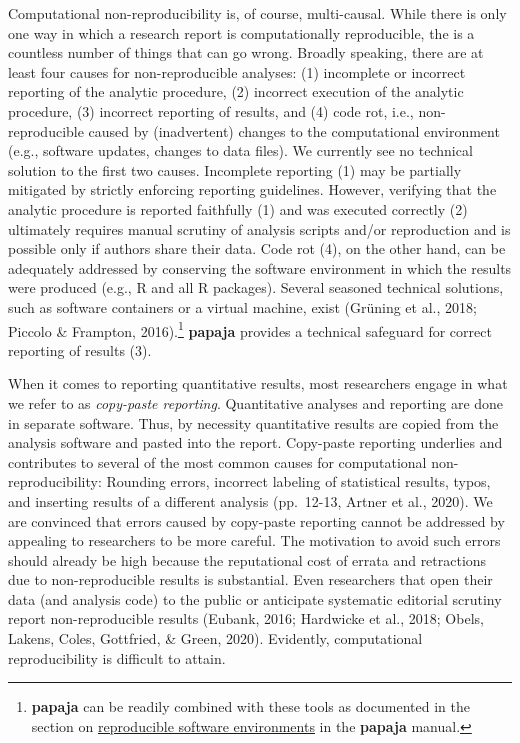 \documentclass[
  english,
  ,man,floatsintext]{apa6}
\begin{document}
Computational non-reproducibility is, of course, multi-causal.
While there is only one way in which a research report is computationally reproducible, the is a countless number of things that can go wrong.
Broadly speaking, there are at least four causes for non-reproducible analyses: (1) incomplete or incorrect reporting of the analytic procedure, (2) incorrect execution of the analytic procedure, (3) incorrect reporting of results, and (4) code rot, i.e., non-reproducible caused by (inadvertent) changes to the computational environment (e.g., software updates, changes to data files).
We currently see no technical solution to the first two causes.
Incomplete reporting (1) may be partially mitigated by strictly enforcing reporting guidelines.
However, verifying that the analytic procedure is reported faithfully (1) and was executed correctly (2) ultimately requires manual scrutiny of analysis scripts and/or reproduction and is possible only if authors share their data.
Code rot (4), on the other hand, can be adequately addressed by conserving the software environment in which the results were produced (e.g., R and all R packages).
Several seasoned technical solutions, such as software containers or a virtual machine, exist (Grüning et al., 2018; Piccolo \& Frampton, 2016).\footnote{\textbf{papaja} can be readily combined with these tools as documented in the section on \href{https://frederikaust.com/papaja_man/tips-and-tricks.html\#reproducible-software-environments}{reproducible software environments} in the \textbf{papaja} manual.}
\textbf{papaja} provides a technical safeguard for correct reporting of results (3).

When it comes to reporting quantitative results, most researchers engage in what we refer to as \emph{copy-paste reporting}.
Quantitative analyses and reporting are done in separate software.
Thus, by necessity quantitative results are copied from the analysis software and pasted into the report.
Copy-paste reporting underlies and contributes to several of the most common causes for computational non-reproducibility: Rounding errors, incorrect labeling of statistical results, typos, and inserting results of a different analysis (pp.~12-13, Artner et al., 2020).
We are convinced that errors caused by copy-paste reporting cannot be addressed by appealing to researchers to be more careful.
The motivation to avoid such errors should already be high because the reputational cost of errata and retractions due to non-reproducible results is substantial.
Even researchers that open their data (and analysis code) to the public or anticipate systematic editorial scrutiny report non-reproducible results (Eubank, 2016; Hardwicke et al., 2018; Obels, Lakens, Coles, Gottfried, \& Green, 2020).
Evidently, computational reproducibility is difficult to attain.
\end{document}
